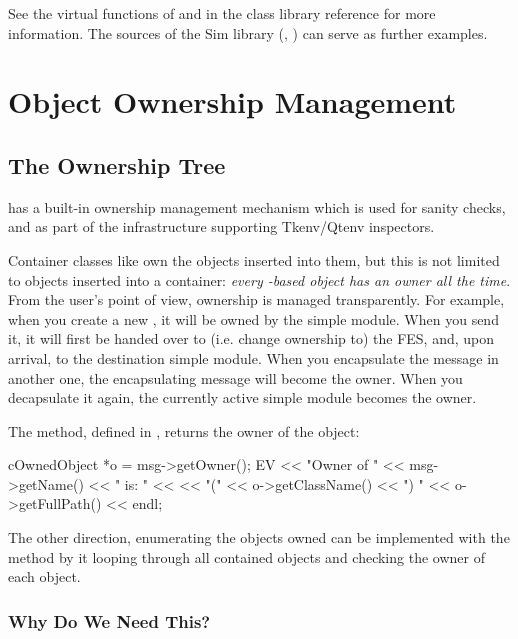 See the virtual functions of  and 
in the class library reference for more information. The sources of the
Sim library (, ) can serve as further examples.



\section{Object Ownership Management}
\label{sec:ch-sim-lib:ownership-management}

\subsection{The Ownership Tree}

{\opp} has a built-in ownership management mechanism which
is used for sanity checks, and as part of the infrastructure
supporting Tkenv/Qtenv inspectors.

Container classes like  own the objects inserted
into them, but this is not limited to objects inserted into a container:
\textit{every -based object has an owner all the time}.
From the user's point of view, ownership is managed transparently.
For example, when you create a new ,
it will be owned by the simple module. When you send it, it will
first be handed over to (i.e. change ownership to) the FES, and,
upon arrival, to the destination simple module. When you encapsulate
the message in another one, the encapsulating message will become
the owner. When you decapsulate it again, the currently active
simple module becomes the owner.

The  method, defined in , returns the
owner of the object:

\begin{cpp}
cOwnedObject *o = msg->getOwner();
EV << "Owner of " << msg->getName() << " is: " <<
   << "(" << o->getClassName() << ") " << o->getFullPath() << endl;
\end{cpp}

The other direction, enumerating the objects owned can be implemented with
the  method by it looping through all
contained objects and checking the owner of each object.

\subsubsection{Why Do We Need This?}

